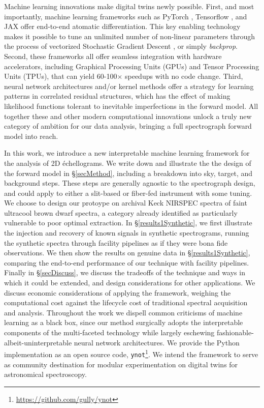 \documentclass[twocolumn]{aastex631}
\begin{document}
Machine learning innovations make digital twins newly possible. First, and most importantly, machine learning frameworks such as PyTorch \citep{2019arXiv191201703P}, Tensorflow \citep{tensorflow2015-whitepaper}, and JAX \citep{jax2018github} offer end-to-end atomatic differentiation.  This key enabling technology makes it possible to tune an unlimited number of non-linear parameters through the process of vectorized Stochastic Gradient Descent \citep[SGD,][]{2016arXiv160904747R}, or simply \emph{backprop}.  Second, these frameworks all offer seamless integration with hardware accelerators, including Graphical Processing Units (GPUs) and Tensor Processing Units (TPUs), that can yield 60-100$\times$ speedups with no code change.  Third, neural network architectures and/or kernel methods offer a strategy for learning patterns in correlated residual structures, which has the effect of making likelihood functions tolerant to inevitable imperfections in the forward model.  All together these and other modern computational innovations unlock a truly new category of ambition for our data analysis, bringing a full spectrograph forward model into reach.

In this work, we introduce a new interpretable machine learning framework for the analysis of 2D \'echellograms.  We write down and illustrate the the design of the forward model in \S \ref{secMethod}, including a breakdown into sky, target, and background steps.  These steps are generally agnostic to the spectrograph design, and could apply to either a slit-based or fiber-fed instrument with some tuning.  We choose to design our protoype on archival Keck NIRSPEC spectra of faint ultracool brown dwarf spectra, a category already identified as particularly vulnerable to poor optimal extraction.  In \S \ref{results1Synthetic}, we first illustrate the injection and recovery of known signals in synthetic spectrograms, running the synthetic spectra through facility pipelines as if they were bona fide observations.  We then show the results on genuine data in \S \ref{results1Synthetic}, comparing the end-to-end performance of our technique with facility pipelines.  Finally in \S \ref{secDiscuss}, we discuss the tradeoffs of the technique and ways in which it could be extended, and design considerations for other applications.  We discuss economic considerations of applying the framework, weighing the computational cost against the lifecycle cost of traditional spectral acquisition and analysis.  Throughout the work we dispell common criticisms of machine learning as a black box, since our method surgically adopts the interpretable components of the multi-faceted technology while largely eschewing fashionable-albeit-uninterpretable neural network architectures.  We provide the Python implementation as an open source code, \texttt{ynot}\footnote{\url{https://github.com/gully/ynot}}.  We intend the framework to serve as community destination for modular experimentation on digital twins for astronomical spectroscopy.
\end{document}
